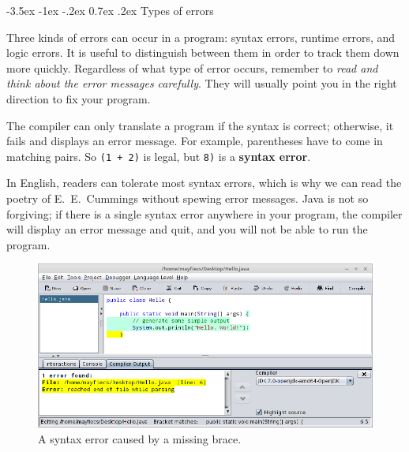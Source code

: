 \documentclass[12pt]{book}
\makeatletter
\theoremstyle{exercise}
\newcommand{\java}[1]{\verb"#1"}
\renewcommand{\section}{\@startsection{section}{1}{\z@}%
    {-3.5ex \@plus -1ex \@minus -.2ex}%
    {0.7ex \@plus.2ex}%
    {\normalfont\Large\bfseries}}
\renewcommand\subsection{\@startsection{subsection}{2}{\z@}%
    {-3.25ex\@plus -1ex \@minus -.2ex}%
    {0.3ex \@plus .2ex}%
    {\normalfont\large\bfseries}}
\newcommand{\java}[1]{\lstinline{#1}} %
\makeatother
\begin{document}
\section{Types of errors}


Three kinds of errors can occur in a program: syntax errors, runtime errors, and logic errors.
It is useful to distinguish between them in order to track them down more quickly.
Regardless of what type of error occurs, remember to {\em read and think about the error messages carefully}.
They will usually point you in the right direction to fix your program.



The compiler can only translate a program if the syntax is correct; otherwise, it fails and displays an error message.
For example, parentheses have to come in matching pairs.
So \java{(1 + 2)} is legal, but \java{8)} is a {\bf syntax error}.

In English, readers can tolerate most syntax errors, which is why we can read the poetry of E.\ E.\ Cummings without spewing error messages.
Java is not so forgiving; if there is a single syntax error anywhere in your program, the compiler will display an error message and quit, and you will not be able to run the program.

\begin{figure}[!h]
\begin{center}
\includegraphics[width=\textwidth]{figs/syntax-error.png}
\caption{A syntax error caused by a missing brace.}
\label{fig:syntax}
\end{center}
\end{figure}
\end{document}
